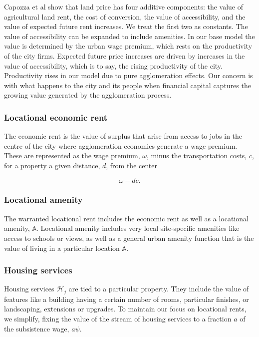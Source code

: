 Capozza et al \cite{capozzaFundamentalsLandPrices1989} show that land price has four additive components: the value of agricultural land rent, the cost of conversion, the value of accessibility, and the value of expected future rent increases. We treat the first two as constants. The value of accessibility  can be expanded to include amenities. In our base model the value is determined by the urban wage premium, which rests on the productivity of the city firms. %
Expected future price increases are driven by increases in the value of accessibility, which is to say, the rising productivity of the city. Productivity rises in our model due to pure agglomeration effects. Our concern is with what happens to the city and its people when financial capital captures the growing value generated by the agglomeration process.  


\subsubsection{Locational economic rent} \label{section-economic-rent}
The \gls{economic rent} is the value of surplus that arise from access to jobs in the centre of the city where agglomeration economies generate a wage premium. These are represented as %
the wage premium, $\omega$, minus the transportation costs, $c$, for a property a given distance, $d$, from the center

\[\omega - {dc}.\]

\subsubsection{Locational amenity} \label{section-locational-rent}
The warranted locational rent includes  the economic rent as well as a locational amenity, $\mathbb{A}$. Locational amenity includes very local site-specific amenities like access to schools or views, as well as a general urban amenity function that is the value of living in a particular location $\mathbb{A}$. %

\subsubsection{Housing services} \label{section-housing-services}
Housing services $\mathcal{H}_j$ are  tied to a particular property. They include the value of features like a building having a certain number of rooms, particular finishes, or landscaping, extensions or upgrades. To maintain our focus on locational rents, we simplify, fixing %
the value of the stream of housing services to a fraction $a$ of the subsistence wage, $a\psi$.

